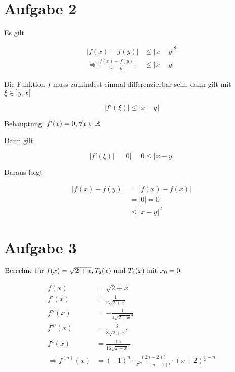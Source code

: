 \documentclass[a4paper, 11pt]{article}
\begin{document}
\section{Aufgabe 2}
\label{sec:org5eb6fbe}
Es gilt

\begin{align*}
    |f(x) - f(y)| &\leq |x - y|^2 \\
    \Leftrightarrow \frac{|f(x) - f(y)|}{|x - y|} &\leq |x - y|
\end{align*}

Die Funktion \(f\) muss zumindest einmal differenzierbar sein, dann gilt mit \(\xi \in ]y, x[\)

\begin{equation*}
    |f'(\xi)| \leq |x - y|
\end{equation*}

Behauptung: \(f'(x) = 0, \forall x \in \mathbb{R}\)

Dann gilt

\begin{equation*}
    |f'(\xi)| = |0| = 0 \leq |x - y|
\end{equation*}

Daraus folgt

\begin{align*}
    |f(x) - f(y)| &= |f(x) - f(x)| \\
    &= |0| = 0 \\
    &\leq |x - y|^2
\end{align*}

\section{Aufgabe 3}
\label{sec:org22621e7}
\begin{math}
    \text{Berechne für  }f(x) = \sqrt{2+x}, T_2(x)\text{ und }
        T_4(x) \text{ mit  }x_0 = 0
    \newline
\end{math}

\begin{align*}
    f(x) &= \sqrt{2+x} \\
    f'(x) &= \frac{1}{2\sqrt{2+x}} \\
    f''(x) &= -\frac{1}{4\sqrt{2+x}^3} \\
    f'''(x) &= \frac{3}{8\sqrt{2+x}^5} \\
    f^4(x) &= \frac{15}{16\sqrt{2+x}^7} \\
    \Rightarrow f^{(n)}(x) &= (-1)^n \cdot \frac{(2n-2)!}{2^{2n-1}(n-1)!} \cdot (x+2)^{\frac{1}{2}-n}
\end{align*}
\end{document}
